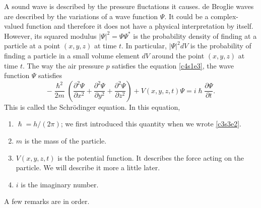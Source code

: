 A sound wave is described by the pressure fluctations it causes. de Broglie
waves are described by the variations of a wave function $\Psi$. It could be a
complex-valued function and therefore it does not have a physical interpretation
by itself. However, its squared modulus $|\Psi|^2 = \Psi\Psi^\ast$ is the 
probability density of finding at a particle at a point $(x, y, z)$ at time $t$.
In particular, $|\Psi|^2 dV$ is the probability of finding a particle in a 
small volume element $dV$ around the point $(x,y,z)$ at time $t$. The way the
air pressure $p$ satisfies the equation \eqref{c4s1e3}, the wave function 
$\Psi$ satisfies 
\begin{equation}\label{c4s1e5}
-\frac{\hslash^2}{2m}\left(\frac{\partial^2\Psi}{\partial x^2} + 
\frac{\partial^2\Psi}{\partial y^2} + \frac{\partial^2\Psi}{\partial z^2}
\right) + V(x,y,z,t)\Psi = i\hslash\frac{\partial\Psi}{\partial t}.
\end{equation}
This is called the Schr\"{o}dinger equation. In this equation,
\begin{enumerate}
\item $\hslash = h/(2\pi)$; we first introduced this quantity when we wrote
\eqref{c3s3e2}.
\item $m$ is the mass of the particle.
\item $V(x, y, z, t)$ is the potential function. It describes the force acting
on the particle. We will describe it more a little later.
\item $i$ is the imaginary number.
\end{enumerate}
A few remarks are in order.

